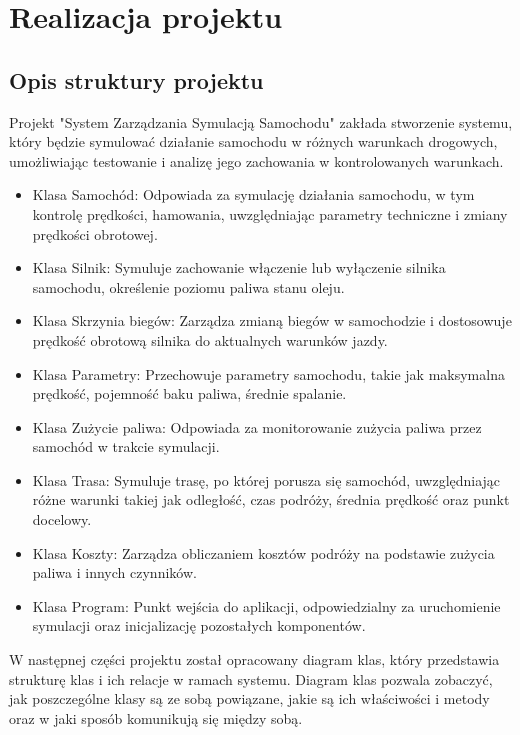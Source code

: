 ﻿%
\chapter{Realizacja projektu}


\section{Opis struktury projektu}

Projekt "System Zarządzania Symulacją Samochodu" zakłada stworzenie systemu, który będzie symulować działanie samochodu w różnych warunkach drogowych, umożliwiając testowanie i analizę jego zachowania w kontrolowanych warunkach.
\begin{itemize}
    \item Klasa Samochód: Odpowiada za symulację działania samochodu, w tym kontrolę prędkości, hamowania, uwzględniając parametry techniczne i zmiany prędkości obrotowej.
    \item Klasa Silnik: Symuluje zachowanie włączenie lub wyłączenie silnika samochodu, określenie poziomu paliwa stanu oleju.
    \item Klasa Skrzynia biegów: Zarządza zmianą biegów w samochodzie i dostosowuje prędkość obrotową silnika do aktualnych warunków jazdy.
    \item Klasa Parametry: Przechowuje parametry samochodu, takie jak maksymalna prędkość, pojemność baku paliwa, średnie spalanie.
    \item Klasa Zużycie paliwa: Odpowiada za monitorowanie zużycia paliwa przez samochód w trakcie symulacji.
    \item Klasa Trasa: Symuluje trasę, po której porusza się samochód, uwzględniając różne warunki takiej jak odległość, czas podróży, średnia prędkość oraz punkt docelowy.
    \item Klasa Koszty: Zarządza obliczaniem kosztów podróży na podstawie zużycia paliwa i innych czynników.
    \item Klasa Program: Punkt wejścia do aplikacji, odpowiedzialny za uruchomienie symulacji oraz inicjalizację pozostałych komponentów.
\end{itemize}

W następnej części projektu został opracowany diagram klas, który przedstawia strukturę klas i ich relacje w ramach systemu. Diagram klas pozwala zobaczyć, jak poszczególne klasy są ze sobą powiązane, jakie są ich właściwości i metody oraz w jaki sposób komunikują się między sobą.

